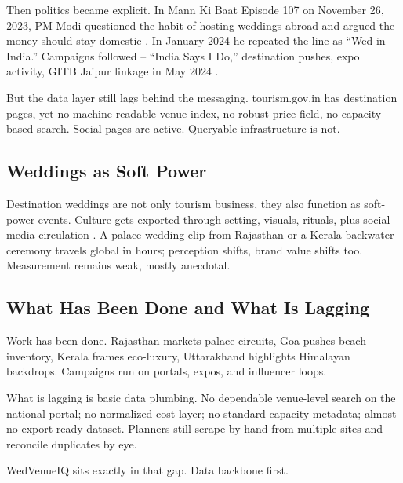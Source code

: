 \documentclass[conference]{IEEEtran}
\begin{document}
Then politics became explicit. In Mann Ki Baat Episode 107 on November 26, 2023, PM Modi questioned the habit of hosting weddings abroad and argued the money should stay domestic \cite{b9}. In January 2024 he repeated the line as ``Wed in India.'' Campaigns followed -- ``India Says I Do,'' destination pushes, expo activity, GITB Jaipur linkage in May 2024 \cite{b10} \cite{b11}.

But the data layer still lags behind the messaging. tourism.gov.in has destination pages, yet no machine-readable venue index, no robust price field, no capacity-based search. Social pages are active. Queryable infrastructure is not.

\subsection{Weddings as Soft Power}

Destination weddings are not only tourism business, they also function as soft-power events. Culture gets exported through setting, visuals, rituals, plus social media circulation \cite{b8}. A palace wedding clip from Rajasthan or a Kerala backwater ceremony travels global in hours; perception shifts, brand value shifts too. Measurement remains weak, mostly anecdotal.

\subsection{What Has Been Done and What Is Lagging}

Work has been done. Rajasthan markets palace circuits, Goa pushes beach inventory, Kerala frames eco-luxury, Uttarakhand highlights Himalayan backdrops. Campaigns run on portals, expos, and influencer loops.

What is lagging is basic data plumbing. No dependable venue-level search on the national portal; no normalized cost layer; no standard capacity metadata; almost no export-ready dataset. Planners still scrape by hand from multiple sites and reconcile duplicates by eye.

WedVenueIQ sits exactly in that gap. Data backbone first.
\end{document}
